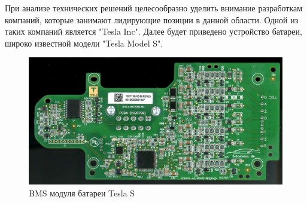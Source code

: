 При анализе технических решений целесообразно уделить внимание разработкам компаний, 
которые занимают лидирующие позиции в данной области. Одной из таких компаний является "Tesla Inc". 
Далее будет приведено устройство батареи, широко известной модели "Tesla Model S".



\begin{figure}[h]
    \includegraphics[width=\linewidth]{img/tesla_bms.jpg}
    \caption{BMS модуля батареи Tesla S}
    \label{fig:tesla_bms}
\end{figure}

